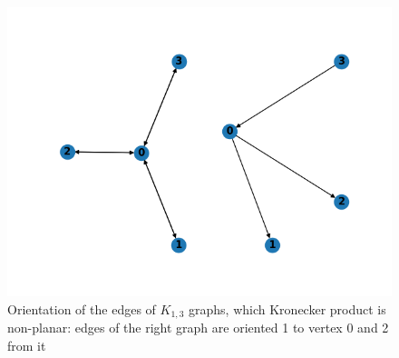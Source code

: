 \begin{figure}[h]

  \begin{center}  
  \includegraphics[scale = 0.3]{k13_21.png}
  \end{center}

  \caption{Orientation of the edges of $K_{1, 3}$ graphs, which Kronecker product is non-planar: edges of the right graph are oriented 1 to vertex $0$ and 2 from it}

  \label{fig:k13_21}

\end{figure}